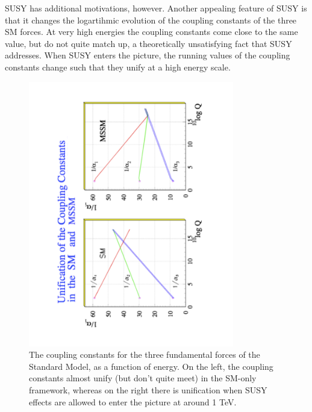 SUSY has additional motivations, however.  Another appealing feature of SUSY is that it 
changes the logartihmic evolution of the coupling constants of the three SM forces.  At very high energies the 
coupling constants come close to the same value, but do not quite match up, 
a theoretically unsatisfying fact that SUSY addresses.  When SUSY enters the picture, the 
running values of the coupling constants change such that they unify at a high energy scale.

\begin{figure}
    \center
	\includegraphics[width=0.8\textwidth,angle=270]{Theory/figures/kazakov_coupling.pdf}
    \caption{The coupling constants for the three fundamental forces of the Standard Model, as a 
    function of energy.  On the left, the coupling constants almost unify 
    (but don't quite meet) in the SM-only framework, 
    whereas on the right there is unification when SUSY effects are allowed to 
    enter the picture at around 1 TeV\cite{Kazakov}. }
	\label{fig:couplings}
\end{figure}


